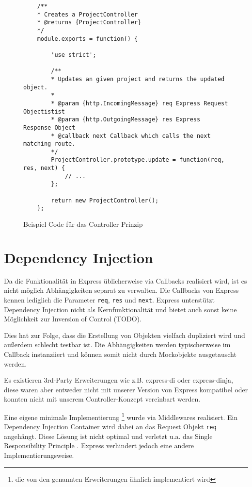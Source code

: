 \begin{figure}[t]
	\centering
	\begin{lstlisting}
	/**
	* Creates a ProjectController
	* @returns {ProjectController}
	*/
	module.exports = function() {
	
		'use strict';
		
		/**
		* Updates an given project and returns the updated object.
		*
		* @param {http.IncomingMessage} req Express Request Objectistist
		* @param {http.OutgoingMessage} res Express Response Object
		* @callback next Callback which calls the next matching route.
		*/
		ProjectController.prototype.update = function(req, res, next) {
			// ...
		};
		
		return new ProjectController();
	};
	\end{lstlisting}
	\caption[controller]{Beispiel Code für das Controller Prinzip}
	\label{f:controller}
\end{figure}

\section{Dependency Injection}\label{dependency-injection}

Da die Funktionalität in Express üblicherweise\cite{express-routing}
via Callbacks realisiert wird, ist es nicht möglich Abhängigkeiten
separat zu verwalten. Die Callbacks von Express kennen lediglich die
Parameter \texttt{req}, \texttt{res} und \texttt{next}. Express
unterstützt Dependency Injection nicht als Kernfunktionalität und bietet
auch sonst keine Möglichkeit zur Inversion of Control (TODO).

Dies hat zur Folge, dass die Erstellung von Objekten vielfach dupliziert
wird und außerdem schlecht testbar ist. Die Abhängigkeiten werden
typischerweise im Callback instanziiert und können somit nicht durch
Mockobjekte ausgetauscht werden.

Es existieren 3rd-Party Erweiterungen wie z.B. express-di\cite{express-di} oder
express-dinja\cite{express-dinja}, diese
waren aber entweder nicht mit unserer Version von Express kompatibel
oder konnten nicht mit unserem Controller-Konzept vereinbart werden.

Eine eigene minimale Implementierung \footnote{die von den genannten
Erweiterungen ähnlich implementiert wird} wurde via Middlewares
realisiert. Ein Dependency Injection Container wird dabei an das Request
Objekt \texttt{req} angehängt. Diese Lösung ist nicht optimal und
verletzt u.a. das Single Responsibility Principle
\cite{srp}. Express verhindert jedoch eine
andere Implementierungsweise.

